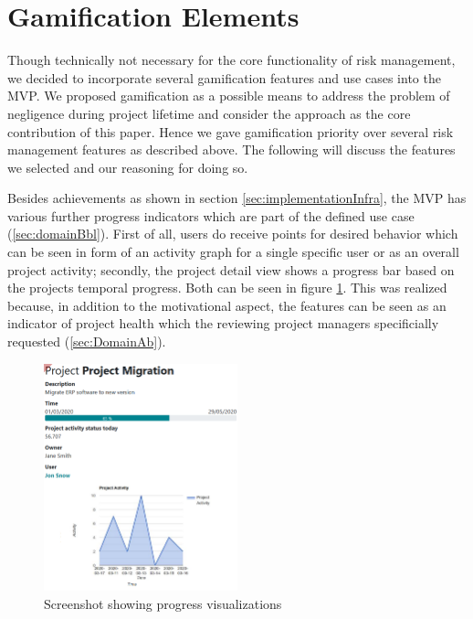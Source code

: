 
\section{Gamification Elements}
\label{sec:implementationGami}

Though technically not necessary for the core functionality of risk management, we decided to incorporate several gamification features and use cases into the \ac{MVP}. We proposed gamification as a possible means to address the problem of negligence during project lifetime and consider the approach as the core contribution of this paper. Hence we gave gamification priority over several risk management features as described above. The following will discuss the features we selected and our reasoning for doing so.

Besides achievements as shown in section \ref{sec:implementationInfra}, the \ac{MVP} has various further progress indicators which are part of the defined use case (\ref{sec:domainBbl}). First of all, users do receive points for desired behavior which can be seen in form of an activity graph for a single specific user or as an overall project activity; secondly, the project detail view shows a progress bar based on the projects temporal progress. Both can be seen in figure \ref{fig:projectdetail}. This was realized because, in addition to the motivational aspect, the features can be seen as an indicator of project health which the reviewing project managers specificially requested (\ref{sec:DomainAb}).

\begin{figure}
	\includegraphics[width=0.5\textwidth]{Assets/implementation_shots/projectdetail.png}
	\caption{Screenshot showing progress visualizations}
	\label{fig:projectdetail}
\end{figure}

